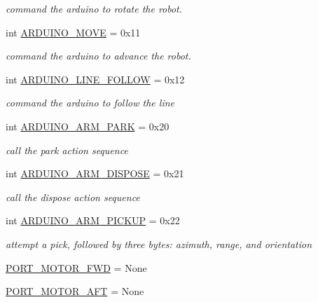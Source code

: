 \begin{DoxyCompactItemize}
\begin{DoxyCompactList}\small\item\em command the arduino to rotate the robot. \end{DoxyCompactList}\item 
int \mbox{\hyperlink{namespaceconstants_acf86d86890beb6e2039a03726e431d71}{A\+R\+D\+U\+I\+N\+O\+\_\+\+M\+O\+VE}} = 0x11
\begin{DoxyCompactList}\small\item\em command the arduino to advance the robot. \end{DoxyCompactList}\item 
int \mbox{\hyperlink{namespaceconstants_a7944abd6ac614939a63da46e49d770f4}{A\+R\+D\+U\+I\+N\+O\+\_\+\+L\+I\+N\+E\+\_\+\+F\+O\+L\+L\+OW}} = 0x12
\begin{DoxyCompactList}\small\item\em command the arduino to follow the line \end{DoxyCompactList}\item 
int \mbox{\hyperlink{namespaceconstants_a53723c1862d52155f319a0d173230568}{A\+R\+D\+U\+I\+N\+O\+\_\+\+A\+R\+M\+\_\+\+P\+A\+RK}} = 0x20
\begin{DoxyCompactList}\small\item\em call the park action sequence \end{DoxyCompactList}\item 
int \mbox{\hyperlink{namespaceconstants_a868e5ebad4edc27cb1c6dc313cec7094}{A\+R\+D\+U\+I\+N\+O\+\_\+\+A\+R\+M\+\_\+\+D\+I\+S\+P\+O\+SE}} = 0x21
\begin{DoxyCompactList}\small\item\em call the dispose action sequence \end{DoxyCompactList}\item 
int \mbox{\hyperlink{namespaceconstants_a17f52a2eba1281743ebe4589f0fdf3f3}{A\+R\+D\+U\+I\+N\+O\+\_\+\+A\+R\+M\+\_\+\+P\+I\+C\+K\+UP}} = 0x22
\begin{DoxyCompactList}\small\item\em attempt a pick, followed by three bytes\+: azimuth, range, and orientation \end{DoxyCompactList}\item 
\mbox{\hyperlink{namespaceconstants_abae2d4247d2f19bd531a7c9e451c6966}{P\+O\+R\+T\+\_\+\+M\+O\+T\+O\+R\+\_\+\+F\+WD}} = None
\item 
\mbox{\hyperlink{namespaceconstants_afe387bef8c8cf12fc5b53305fda2ddf5}{P\+O\+R\+T\+\_\+\+M\+O\+T\+O\+R\+\_\+\+A\+FT}} = None
\item 

\end{DoxyCompactItemize}
